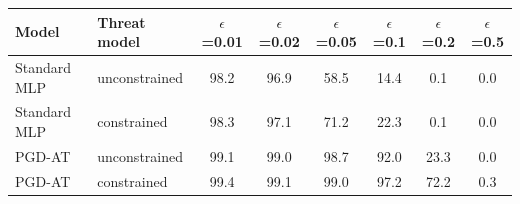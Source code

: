 \begin{tabular}{llcccccc}
\toprule
Model & Threat model & $\epsilon$=0.01 & $\epsilon$=0.02 & $\epsilon$=0.05 & $\epsilon$=0.1 & $\epsilon$=0.2 & $\epsilon$=0.5 \\
\midrule
Standard MLP & unconstrained & 98.2 & 96.9 & 58.5 & 14.4 & 0.1 & 0.0 \\
Standard MLP & constrained & 98.3 & 97.1 & 71.2 & 22.3 & 0.1 & 0.0 \\
PGD-AT & unconstrained & 99.1 & 99.0 & 98.7 & 92.0 & 23.3 & 0.0 \\
PGD-AT & constrained & 99.4 & 99.1 & 99.0 & 97.2 & 72.2 & 0.3 \\
\bottomrule
\end{tabular}